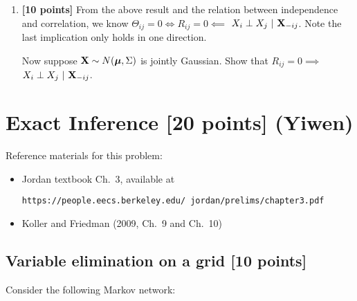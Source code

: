 \documentclass{article}
\begin{document}
\begin{enumerate}
\item 
\textbf{[10 points]}
From the above result and the relation between independence and correlation, we know $ \Theta_{ij} = 0 \iff R_{ij} = 0 \impliedby $ $ X_i \perp  X_j \ | \ \Xbf_{-ij} $. 
Note the last implication only holds in one direction. 

Now suppose $ \mathbf{X} \sim N(\boldsymbol{\mu}, \Sigma) $ is jointly Gaussian.
Show that $ R_{ij} = 0 \implies $ $ X_i \perp  X_j \ | \ \Xbf_{-ij} $. 









\end{enumerate}



















\newpage

\section{Exact Inference [20 points] (Yiwen)}


Reference materials for this problem: 
\begin{itemize}
    \item Jordan textbook Ch.~3, available at 
    
    {\texttt{https://people.eecs.berkeley.edu/~jordan/prelims/chapter3.pdf}}
    \item Koller and Friedman (2009, Ch.~9 and Ch.~10)
\end{itemize}



\subsection{Variable elimination on a grid [10 points]}

Consider the following Markov network:

\begin{figure}[h]
\centering
{}
\end{figure}
\end{document}
